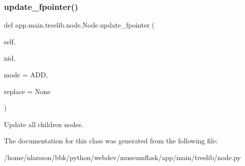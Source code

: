 \subsubsection{\texorpdfstring{update\+\_\+fpointer()}{update\_fpointer()}}
{\footnotesize\ttfamily def app.\+main.\+treelib.\+node.\+Node.\+update\+\_\+fpointer (\begin{DoxyParamCaption}\item[{}]{self,  }\item[{}]{nid,  }\item[{}]{mode = {\ttfamily ADD},  }\item[{}]{replace = {\ttfamily None} }\end{DoxyParamCaption})}

\begin{DoxyVerb}Update all children nodes.\end{DoxyVerb}
 

The documentation for this class was generated from the following file\+:\begin{DoxyCompactItemize}
\item 
/home/nlarsson/bbk/python/webdev/museumflask/app/main/treelib/node.\+py\end{DoxyCompactItemize}
